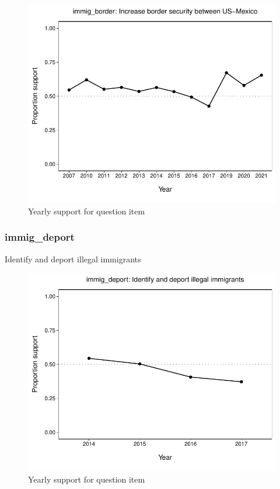 \documentclass[
  12pt]{article}
\begin{document}
\begin{figure}

{\centering \includegraphics{error-checking_files/figure-latex/unnamed-chunk-3-20} 

}

\caption{Yearly support for question item}\label{fig:unnamed-chunk-3-20}
\end{figure}

\hypertarget{immig_deport}{%
\subsubsection{immig\_deport}\label{immig_deport}}

Identify and deport illegal immigrants

\begin{figure}

{\centering \includegraphics{error-checking_files/figure-latex/unnamed-chunk-3-21} 

}

\caption{Yearly support for question item}\label{fig:unnamed-chunk-3-21}
\end{figure}
\end{document}
